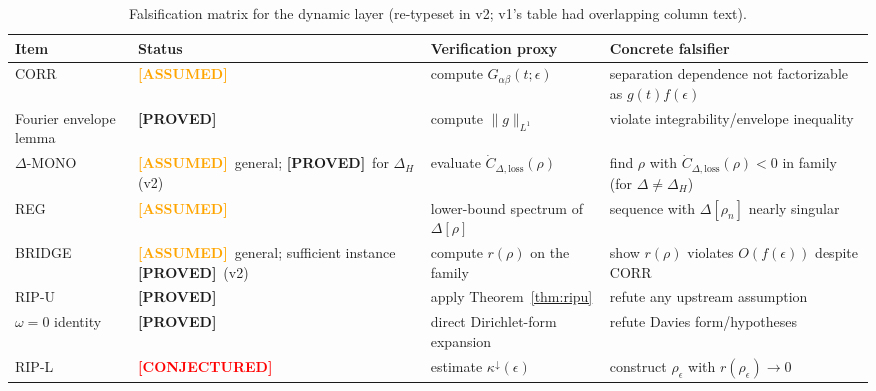 \documentclass[11pt]{article}
\theoremstyle{definition}
\theoremstyle{remark}
\newcommand{\ASSUMED}{\textcolor{orange}{\textbf{[ASSUMED]}}}
\newcommand{\PROVED}{\textcolor{green!60!black}{\textbf{[PROVED]}}}
\newcommand{\CONJ}{\textcolor{red}{\textbf{[CONJECTURED]}}}
\begin{document}
\begin{table}[h!]
\centering
\begin{tabular}{p{2.6cm} p{3.2cm} p{4.0cm} p{4.6cm}}
\hline
\textbf{Item} & \textbf{Status} & \textbf{Verification proxy} &
\textbf{Concrete falsifier} \\
\hline
CORR & \ASSUMED & compute $G_{\alpha\beta}(t;\epsilon)$ & separation
dependence not factorizable as $g(t)f(\epsilon)$ \\
Fourier envelope lemma & \PROVED & compute $\|g\|_{L^1}$ & violate
integrability/envelope inequality \\
$\Delta$-MONO & \ASSUMED\ general; \PROVED\ for $\Delta_H$ (v2) &
evaluate $\dot{C}_{\Delta,\mathrm{loss}}(\rho)$ & find $\rho$ with
$\dot{C}_{\Delta,\mathrm{loss}}(\rho) < 0$ in family (for $\Delta \ne
\Delta_H$) \\
REG & \ASSUMED & lower-bound spectrum of $\Delta[\rho]$ & sequence with
$\Delta[\rho_n]$ nearly singular \\
BRIDGE & \ASSUMED\ general; sufficient instance \PROVED\ (v2) & compute
$r(\rho)$ on the family & show $r(\rho)$ violates $O(f(\epsilon))$
despite CORR \\
RIP-U & \PROVED & apply Theorem~\ref{thm:ripu} & refute any upstream
assumption \\
$\omega = 0$ identity & \PROVED & direct Dirichlet-form expansion &
refute Davies form/hypotheses \\
RIP-L & \CONJ & estimate $\kappa^{\downarrow}(\epsilon)$ & construct
$\rho_\epsilon$ with $r(\rho_\epsilon) \to 0$ \\
\hline
\end{tabular}
\caption{Falsification matrix for the dynamic layer (re-typeset in v2;
v1's table had overlapping column text).}
\label{tab:fals}
\end{table}
\end{document}
